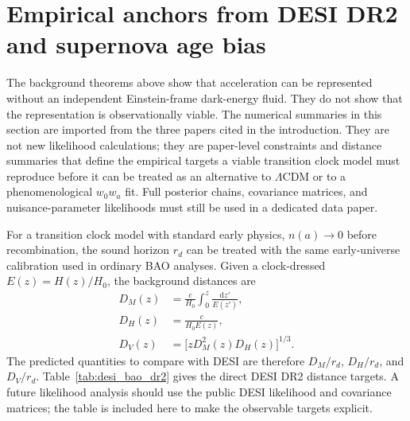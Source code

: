 \documentclass[aps,prd,reprint,nofootinbib,superscriptaddress,longbibliography]{revtex4-2}
\newcommand{\dd}{\mathrm{d}}
\newcommand{\LCDM}{$\Lambda$CDM}
\begin{document}
\section{Empirical anchors from DESI DR2 and supernova age bias}

The background theorems above show that acceleration can be represented without an independent Einstein-frame dark-energy fluid.  They do not show that the representation is observationally viable.  The numerical summaries in this section are imported from the three papers cited in the introduction.  They are not new likelihood calculations; they are paper-level constraints and distance summaries that define the empirical targets a viable transition clock model must reproduce before it can be treated as an alternative to \LCDM{} or to a phenomenological $w_0w_a$ fit.  Full posterior chains, covariance matrices, and nuisance-parameter likelihoods must still be used in a dedicated data paper.

For a transition clock model with standard early physics, $n(a)\to0$ before recombination, the sound horizon $r_d$ can be treated with the same early-universe calibration used in ordinary BAO analyses.  Given a clock-dressed $E(z)=H(z)/H_0$, the background distances are
\begin{align}
D_M(z)&=\frac{c}{H_0}\int_0^z\frac{\dd z'}{E(z')},\nonumber\\
D_H(z)&=\frac{c}{H_0E(z)},\nonumber\\
D_V(z)&=\big[zD_M^2(z)D_H(z)\big]^{1/3}.
\label{eq:bao_distances}
\end{align}
The predicted quantities to compare with DESI are therefore $D_M/r_d$, $D_H/r_d$, and $D_V/r_d$.  Table~\ref{tab:desi_bao_dr2} gives the direct DESI DR2 distance targets.  A future likelihood analysis should use the public DESI likelihood and covariance matrices; the table is included here to make the observable targets explicit.
\end{document}
